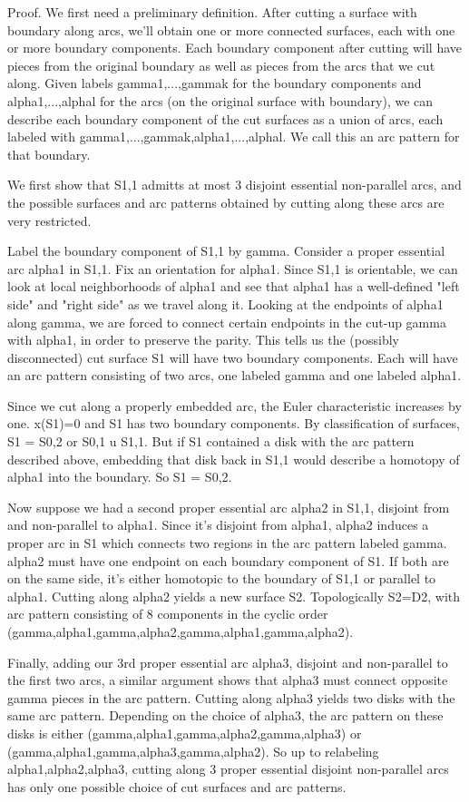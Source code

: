 \documentclass[12pt]{amsart}
\theoremstyle{definition}
\begin{document}
Proof. We first need a preliminary definition. After cutting a surface with
boundary along arcs, we'll obtain one or more connected surfaces, each with one
or more boundary components. Each boundary component after cutting will have
pieces from the original boundary as well as pieces from the arcs that we cut
along. Given labels gamma1,...,gammak for the boundary components and
alpha1,...,alphal for the arcs (on the original surface with boundary), we can
describe each boundary component of the cut surfaces as a union of arcs, each
labeled with gamma1,...,gammak,alpha1,...,alphal. We call this an arc pattern
for that boundary.

We first show that S1,1 admitts at most 3 disjoint essential non-parallel arcs,
and the possible surfaces and arc patterns obtained by cutting along these arcs
are very restricted.

Label the boundary component of S1,1 by gamma. Consider a proper essential arc
alpha1 in S1,1. Fix an orientation for alpha1. Since S1,1 is orientable, we can
look at local neighborhoods of alpha1 and see that alpha1 has a well-defined
"left side" and "right side" as we travel along it. Looking at the endpoints of
alpha1 along gamma, we are forced to connect certain endpoints in the cut-up
gamma with alpha1, in order to preserve the parity. This tells us the (possibly
disconnected) cut surface S1 will have two boundary components. Each will have
an arc pattern consisting of two arcs, one labeled gamma and one labeled
alpha1.

Since we cut along a properly embedded arc, the Euler characteristic increases
by one. x(S1)=0 and S1 has two boundary components. By classification of
surfaces, S1 = S0,2 or S0,1 u S1,1. But if S1 contained a disk with the arc
pattern described above, embedding that disk back in S1,1 would describe
a homotopy of alpha1 into the boundary. So S1 = S0,2.

Now suppose we had a second proper essential arc alpha2 in S1,1, disjoint from
and non-parallel to alpha1. Since it's disjoint from alpha1, alpha2 induces
a proper arc in S1 which connects two regions in the arc pattern labeled gamma.
alpha2 must have one endpoint on each boundary component of S1. If both are on
the same side, it's either homotopic to the boundary of S1,1 or parallel to
alpha1. Cutting along alpha2 yields a new surface S2. Topologically S2=D2, with
arc pattern consisting of 8 components in the cyclic order
(gamma,alpha1,gamma,alpha2,gamma,alpha1,gamma,alpha2).

Finally, adding our 3rd proper essential arc alpha3, disjoint and non-parallel
to the first two arcs, a similar argument shows that alpha3 must connect
opposite gamma pieces in the arc pattern. Cutting along alpha3 yields two disks
with the same arc pattern. Depending on the choice of alpha3, the arc pattern
on these disks is either (gamma,alpha1,gamma,alpha2,gamma,alpha3) or
(gamma,alpha1,gamma,alpha3,gamma,alpha2). So up to relabeling
alpha1,alpha2,alpha3, cutting along 3 proper essential disjoint non-parallel
arcs has only one possible choice of cut surfaces and arc patterns.
\end{document}
